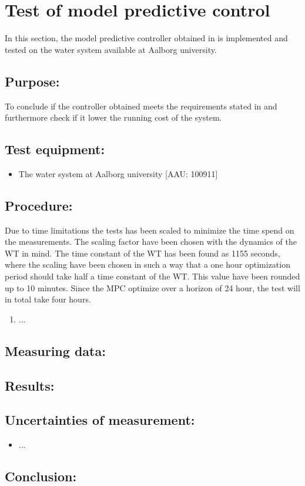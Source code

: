 \section{Test of model predictive control}
\label{sec:MPT_test}

In this section, the model predictive controller obtained in  is implemented and tested on the water system available at Aalborg university. 

\subsection*{Purpose:}

To conclude if the controller obtained meets the requirements stated in  and furthermore check if it lower the running cost of the system.

\subsection*{Test equipment:}
\begin{itemize}
\item The water system at Aalborg university [AAU: 100911]
\end{itemize}

\subsection*{Procedure:}
Due to time limitations the tests has been scaled to minimize the time spend on the measurements. The scaling factor have been chosen with the dynamics of the WT in mind. The time constant of the WT has been found as 1155 seconds, where the scaling have been chosen in such a way that a one hour optimization period should take half a time constant of the WT. This value have been rounded up to 10 minutes. 
Since the MPC optimize over a horizon of 24 hour, the test will in total take four hours.

\begin{enumerate}
\item ...
\end{enumerate}


\subsection*{Measuring data:}

\subsection*{Results:}


\subsection*{Uncertainties of measurement:}
\begin{itemize}
\item ...
\end{itemize}

\subsection*{Conclusion:}

